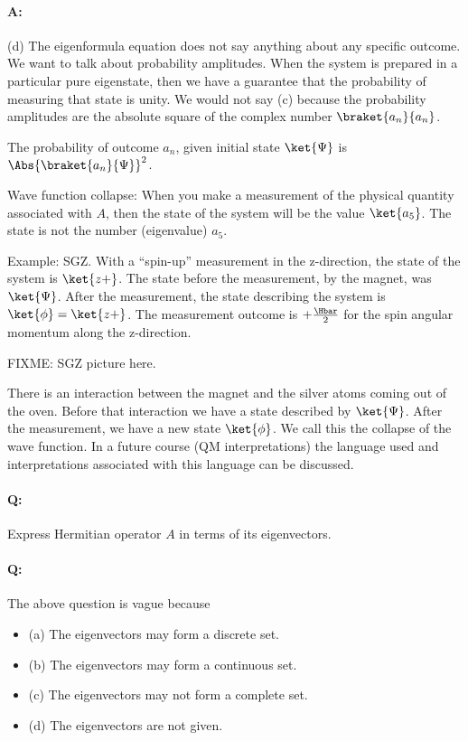 \paragraph{A:} (d) The eigenformula equation does not say anything about any specific outcome.  We want to talk about probability amplitudes.  When the system is prepared in a particular pure eigenstate, then we have a guarantee that the probability of measuring that state is unity.  We would not say (c) because the probability amplitudes are the absolute square of the complex number \(\braket{a_n}{a_n}\).

The probability of outcome \(a_n\), given initial state \(\ket{\Psi}\) is \(\Abs{\braket{a_n}{\Psi}}^2\).

Wave function collapse:  When you make a measurement of the physical quantity associated with \(A\), then the state of the system will be the value \(\ket{a_5}\).  The state is not the number (eigenvalue) \(a_5\).

Example: SGZ.  With a ``spin-up'' measurement in the z-direction, the state of the system is \(\ket{z+}\).  The state before the measurement, by the magnet, was \(\ket{\Psi}\).  After the measurement, the state describing the system is \(\ket{\phi} = \ket{z+}\).  The measurement outcome is \(+\frac{\Hbar}{2}\) for the spin angular momentum along the z-direction.

FIXME: SGZ picture here.

There is an interaction between the magnet and the silver atoms coming out of the oven.  Before that interaction we have a state described by \(\ket{\Psi}\).  After the measurement, we have a new state \(\ket{\phi}\).  We call this the collapse of the wave function.  In a future course (QM interpretations) the language used and interpretations associated with this language can be discussed.

\paragraph{Q:} Express Hermitian operator \(A\) in terms of its eigenvectors.
\paragraph{Q:} The above question is vague because

\begin{itemize}
\item (a) The eigenvectors may form a discrete set.
\item (b) The eigenvectors may form a continuous set.
\item (c) The eigenvectors may not form a complete set.
\item (d) The eigenvectors are not given.
\end{itemize}

